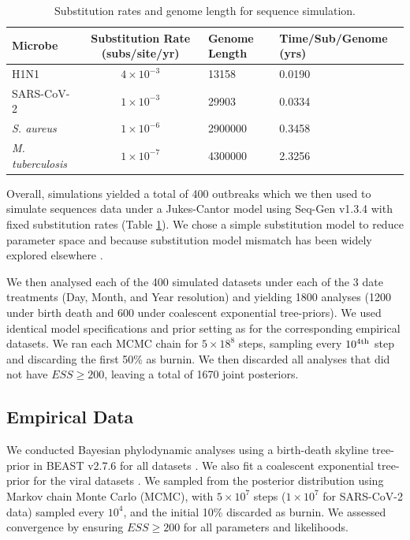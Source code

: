 \documentclass{article}
\begin{document}
\begin{spacing}{1.5}
\begin{table}[h!]
    \centering
    \caption{Substitution rates and genome length for sequence simulation.}
    \begin{tabular}{l|c|l|l}
    \hline
    Microbe                     &   Substitution Rate (subs/site/yr) & Genome Length & Time/Sub/Genome (yrs)  \\
    \hline
    H1N1                        & $4\times10^{-3}$ & 13158 & 0.0190\\
    SARS-CoV-2                  & $1\times10^{-3}$ & 29903 & 0.0334\\
    \textit{S. aureus}    & $1\times10^{-6}$ & 2900000  & 0.3458\\
    \textit{M. tuberculosis}    &   $1\times10^{-7}$ & 4300000 & 2.3256\\
    \hline
    \end{tabular}
    \label{tab:seq_parms}
\end{table}

Overall, simulations yielded a total of 400 outbreaks which we then used to simulate sequences data under a Jukes-Cantor model using Seq-Gen v1.3.4 \citep{rambaut_seq-gen_1997} with fixed substitution rates (Table \ref{tab:seq_parms}). We chose a simple substitution model to reduce parameter space and because substitution model mismatch has been widely explored elsewhere \citep{lemmon2004importance}.

We then analysed each of the 400 simulated datasets under each of the 3 date treatments (Day, Month, and Year resolution) and yielding 1800 analyses (1200 under birth death and 600 under coalescent exponential tree-priors). We used identical model specifications and prior setting as for the corresponding empirical datasets. We ran each MCMC chain for $5\times18^{8}$ steps, sampling every $10^{4\textnormal{th}}$ step and discarding the first 50\% as burnin. We then discarded all analyses that did not have $ESS\geq200$, leaving a total of 1670 joint posteriors.

\subsection*{Empirical Data}
We conducted Bayesian phylodynamic analyses using a birth-death skyline tree-prior in BEAST v2.7.6 for all datasets \citep{bouckaert_beast_2019,stadler2012estimating}. We also fit a coalescent exponential tree-prior for the viral datasets \citep{kingman_1982_coalescent}. We sampled from the posterior distribution using Markov chain Monte Carlo (MCMC), with $5\times10^{7}$ steps ($1\times10^{7}$ for SARS-CoV-2 data) sampled every $10^{4}$, and the initial 10\% discarded as burnin. We assessed convergence by ensuring $ESS\geq200$ for all parameters and likelihoods.


\end{spacing}
\end{document}
